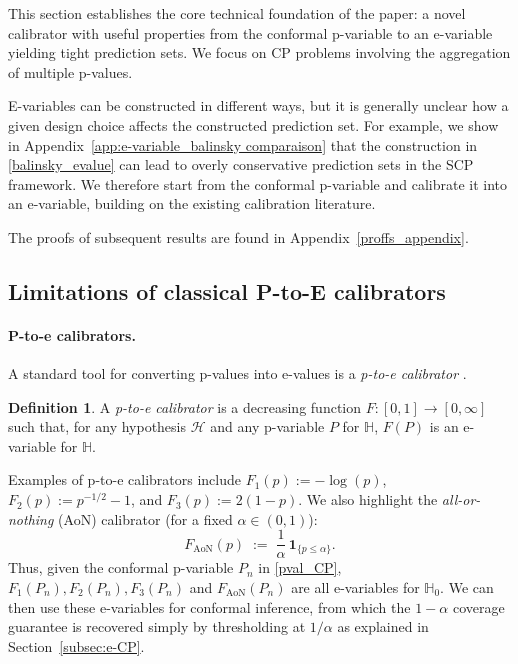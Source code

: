 \documentclass{article}
\theoremstyle{plain}
\theoremstyle{definition}
\newtheorem{definition}[theorem]{Definition}
\theoremstyle{remark}
\begin{document}
This section establishes the core technical foundation of the paper: a novel calibrator with useful properties from the conformal p-variable to an e-variable yielding tight prediction sets. We focus on CP problems involving the aggregation of multiple p-values.

E-variables can be constructed in different ways, but it is generally unclear how a given design choice affects the constructed prediction set. For example, we show in Appendix~\ref{app:e-variable_balinsky comparaison} that the construction in \eqref{balinsky_evalue} can lead to overly conservative prediction sets in the SCP framework. We therefore start from the conformal p-variable and calibrate it into an e-variable, building on the existing calibration literature.

The proofs of subsequent results are found in Appendix~\ref{proffs_appendix}. 

\subsection{Limitations of classical P-to-E calibrators}

\paragraph{P-to-e calibrators.} A standard tool for converting p-values into e-values is a \emph{p-to-e calibrator} \citep{vovk2021values,evaluespoly}.

\begin{definition}
A \emph{p-to-e calibrator} is a decreasing function $F:[0,1]\to[0,\infty]$ such that, for any hypothesis $\mathcal H$ and any p-variable $P$ for $\mathbb H$, $F(P)$ is an e-variable for $\mathbb H$.
\end{definition}
Examples of p-to-e calibrators include $F_1(p):=-\log(p)$, $F_2(p):=p^{-1/2}-1$, and $F_3(p):=2(1-p)$.
We also highlight the \emph{all-or-nothing} (AoN) calibrator (for a fixed $\alpha\in(0,1)$):
\[
F_{\mathrm{AoN}}(p)\;:=\;\frac{1}{\alpha}\,\mathbf{1}_{\{p\le \alpha\}}.
\]
Thus, given the conformal p-variable $P_n$ in \eqref{pval_CP}, $F_1(P_n),F_2(P_n),F_3(P_n)$ and $F_{\mathrm{AoN}}(P_n)$ are all e-variables for $\mathbb{H}_0$.
We can then use these e-variables for conformal inference, from which the $1-\alpha$ coverage guarantee is recovered simply by thresholding at $1/\alpha$ as explained in Section~\ref{subsec:e-CP}.

\end{document}

